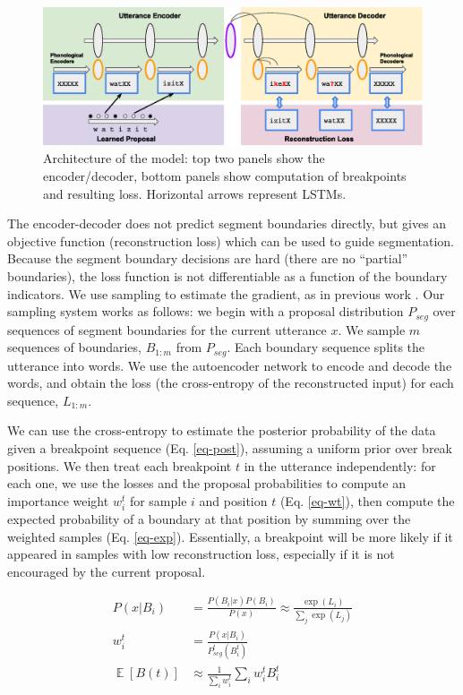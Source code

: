 \documentclass[11pt,letterpaper]{article}
\DeclareMathOperator*{\Exp}{\mathbb{E}}
\begin{document}
\begin{figure}
\includegraphics[width=\textwidth]{arch.eps}
\caption{Architecture of the model: top two panels show the
  encoder/decoder, bottom panels show computation of breakpoints and
  resulting loss. Horizontal arrows represent LSTMs.}
\label{fig-arch}
\end{figure}

The encoder-decoder does not predict segment boundaries directly, but
gives an objective function (reconstruction loss) which can be used to
guide segmentation. Because the segment boundary decisions are hard
(there are no ``partial'' boundaries), the loss function is not
differentiable as a function of the boundary indicators. We use
sampling to estimate the gradient, as in previous work
\cite{Mnih14,Xu15}. Our sampling system works as follows: we
begin with a proposal distribution $P_{seg}$ over sequences of segment
boundaries for the current utterance $x$. We sample $m$ sequences of
boundaries, $B_{1:m}$ from $P_{seg}$. Each boundary sequence splits
the utterance into words. We use the autoencoder network to encode and
decode the words, and obtain the loss (the cross-entropy of the
reconstructed input) for each sequence, $L_{1:m}$.

We can use the cross-entropy to estimate the posterior probability of
the data given a breakpoint sequence (Eq. \ref{eq-post}), assuming a
uniform prior over break positions. We then treat each breakpoint $t$
in the utterance independently: for each one, we use the losses and
the proposal probabilities to compute an importance weight $w_i^t$ for
sample $i$ and position $t$ (Eq. \ref{eq-wt}), then compute the
expected probability of a boundary at that position by summing over
the weighted samples (Eq. \ref{eq-exp}).  Essentially, a breakpoint
will be more likely if it appeared in samples with low reconstruction
loss, especially if it is not encouraged by the current proposal.

\begin{align}
P(x|B_i) &= \frac{P(B_i|x)P(B_i)}{P(x)} \approx \frac{\exp(L_i)}{\sum_j
  \exp(L_j)}
\label{eq-post}\\
w_i^t &= \frac{P(x|B_i)}{P_{seg}^t(B_i^t)}
\label{eq-wt}\\
\Exp[B(t)] &\approx \frac{1}{\sum_i w_i^t} \sum_i w_i^t B_i^t
\label{eq-exp}
\end{align}
\end{document}
